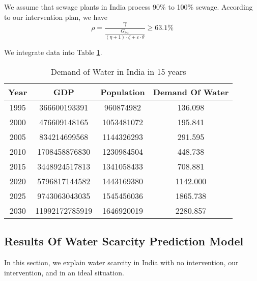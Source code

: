 \documentclass[tcn = 45538, sheet = true, abstract = true]{mcmthesis}
\begin{document}
We assume that sewage plants in India process 90\% to 100\% sewage.  
According to our intervention plan, 
we have
\begin{equation}
\rho = \frac{\gamma}{ \frac{G_{let}}{(\eta + 1) \cdot \zeta + \varepsilon \cdot \theta} } \geqslant 63.1\%
\end{equation}

We integrate data into Table \ref{tab:demandOfWater}. 
\begin{table}[]
\centering
\begin{tabular}{@{}cccc@{}}
\toprule
Year & GDP & Population & Demand Of Water \\ \midrule
1995 & 366600193391 & 960874982 & 136.098 \\
2000 & 476609148165 & 1053481072 & 195.841 \\
2005 & 834214699568 & 1144326293 & 291.595 \\
2010 & 1708458876830 & 1230984504 & 448.738 \\
2015 & 3448924517813 & 1341058433 & 708.881 \\
2020 & 5796817144582 & 1443169380 & 1142.000 \\
2025 & 9743063043035 & 1545456036 & 1865.738 \\
2030 & 11992172785919 & 1646920019 & 2280.857 \\
\bottomrule
\end{tabular}
\caption{Demand of Water in India in 15 years}
\label{tab:demandOfWater}
\end{table}

\subsection{Results Of Water Scarcity Prediction Model}

\hspace{1.5 em} In this section, 
we explain water scarcity in India with no intervention, 
our intervention, 
and in an ideal situation.
\end{document}
